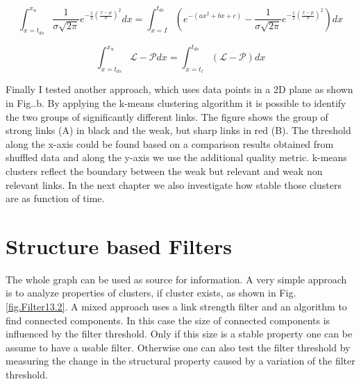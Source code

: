\documentclass[a4paper,10pt]{scrbook}
\begin{document}


\begin{equation}
 \int_{x=t_{ds}}^{x_u} \frac{1}{\sigma\sqrt{2\pi}} e^{ -\frac{1}{2}\left(\frac{x-\mu}{\sigma}\right)^2 } dx = \int_{x=I}^{t_{ds}} ( e^{-(a x^2 + bx +c)} - \frac{1}{\sigma\sqrt{2\pi}} e^{ -\frac{1}{2}\left(\frac{x-\mu}{\sigma}\right)^2 } )dx
 \label{eqthreshold}
\end{equation} 

\begin{equation}
 \int_{x=t_{ds}}^{x_u} \mathcal{L} - \mathcal{P} dx = \int_{x=t_l	}^{t_{ds}} ( \mathcal{L} - \mathcal{P} )dx
\end{equation} 

Finally I tested another approach, which uses data points in a 2D plane as shown in Fig.\label{fig.DynamicThreshhold}.b. By applying the k-means clustering algorithm it is possible to identify the two groups of significantly different links. The figure shows the group of strong links (A) in black and the weak, but sharp links in red (B). The threshold along the x-axis could be found based on a comparison results obtained from shuffled data and along the y-axis we use the additional quality metric. k-means clusters reflect the boundary between the weak but relevant and weak non relevant links. In the next chapter we also investigate how stable those clusters are as function of time.
 
%

\label{ext.fig.DefineFilterThreshold} 


\section{Structure based Filters}
The whole graph can be used as source for information. A very simple approach is to analyze properties of clusters, if cluster exists, as shown in Fig.\ref{fig.Filter13.2}.
A mixed approach uses a link strength filter and an algorithm to find connected components. In this case the size of connected components is influenced by the filter threshold. Only if this size is a stable property one can be assume to have a 
usable filter. Otherwise one can also test the filter threshold by measuring the change in the structural property caused by a variation of the filter threshold. 
\end{document}
